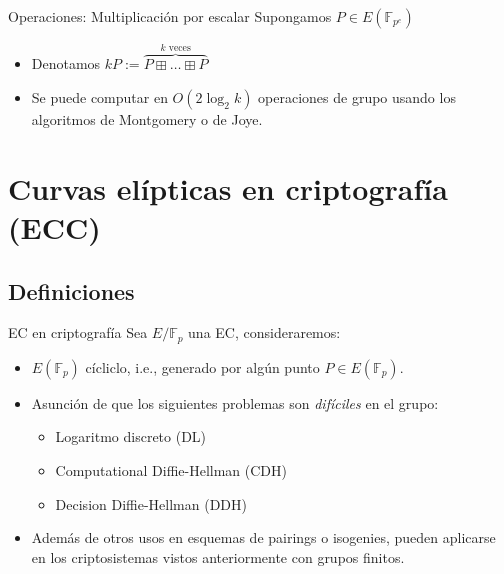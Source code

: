 \documentclass{beamer}
\theoremstyle{remark}
\begin{document}
\begin{frame}{Operaciones: Multiplicación por escalar}
  Supongamos $P \in E(\mathbb{F}_{p^e})$
  \begin{itemize}
    \item<1-> Denotamos $kP := \overbrace{P \boxplus \dots \boxplus P}^{k\text{ veces}}$
    \item<2-> Se puede computar en $O(2\log_2 k)$ operaciones de grupo usando los algoritmos 
      de Montgomery o de Joye.
  \end{itemize}
\end{frame}

\section{Curvas elípticas en criptografía (ECC)}
\subsection{Definiciones}
\begin{frame}{EC en criptografía}
  Sea $E/\mathbb{F}_p$ una EC, consideraremos:
  \begin{itemize}
    \item<1-> $E(\mathbb{F}_p)$ cícliclo, i.e., generado por algún punto $P \in E(\mathbb{F}_p)$.
    \item<2-> Asunción de que los siguientes problemas son \textit{difíciles} en 
      el grupo:
      \begin{itemize}
        \item Logaritmo discreto (DL)
        \item Computational Diffie-Hellman (CDH)
        \item Decision Diffie-Hellman (DDH)
      \end{itemize}
    \item<3-> Además de otros usos en esquemas de pairings o isogenies, pueden 
      aplicarse en los criptosistemas vistos anteriormente con grupos finitos.
  \end{itemize}
\end{frame}
\end{document}

